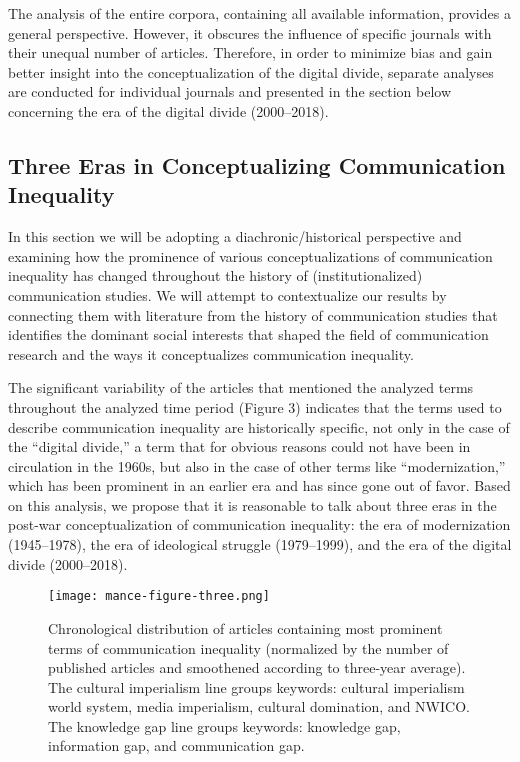 \documentclass{tufte-handout}
\begin{document}
The analysis of the entire corpora, containing all available
information, provides a general perspective. However, it obscures the
influence of specific journals with their unequal number of articles.
Therefore, in order to minimize bias and gain better insight into the
conceptualization of the digital divide, separate analyses are conducted
for individual journals and presented in the section below concerning
the era of the digital divide (2000--2018).

\hypertarget{three-eras-in-conceptualizing-communication-inequality}{%
\subsection{Three Eras in Conceptualizing
Communication
Inequality}\label{three-eras-in-conceptualizing-communication-inequality}}

In this section we will be adopting a diachronic/historical perspective
and examining how the prominence of various conceptualizations of
communication inequality has changed throughout the history of
(institutionalized) communication studies. We will attempt to
contextualize our results by connecting them with literature from the
history of communication studies that identifies the dominant social
interests that shaped the field of communication research and the ways
it conceptualizes communication inequality.

The significant variability of the articles that mentioned the analyzed
terms throughout the analyzed time period (Figure 3) indicates that the
terms used to describe communication inequality are historically
specific, not only in the case of the ``digital divide,'' a term that
for obvious reasons could not have been in circulation in the 1960s, but
also in the case of other terms like ``modernization,'' which has been
prominent in an earlier era and has since gone out of favor. Based on
this analysis, we propose that it is reasonable to talk about three eras
in the post-war conceptualization of communication inequality: the era
of modernization (1945--1978), the era of ideological struggle
(1979--1999), and the era of the digital divide (2000--2018).


\begin{figure}
    \centering
    \texttt{[image: mance-figure-three.png]}
    \caption{Chronological distribution of articles containing most
prominent terms of communication inequality (normalized by the number of
published articles and smoothened according to three-year average). The
cultural imperialism line groups keywords: cultural imperialism world
system, media imperialism, cultural domination, and NWICO. The knowledge
gap line groups keywords: knowledge gap, information gap, and
communication gap.}
    \label{fig:three}
\end{figure}
\end{document}
